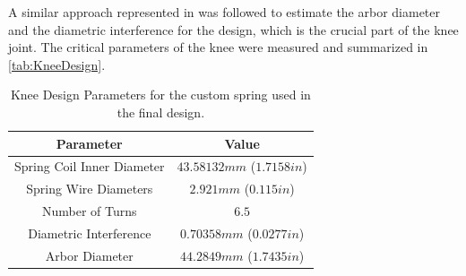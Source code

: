 A similar approach represented in \cite{tung2013design} was followed to estimate the arbor diameter and the diametric interference for the design, which is the crucial part of the knee joint. The critical parameters of the knee were measured and summarized in \autoref{tab:KneeDesign}.

\begin{table}[h!]
\centering
 \begin{tabular}{|c || c|} 
 \hline
 Parameter & Value  \\ [0.5ex] 
 \hline\hline
 Spring Coil Inner Diameter   & $43.58132mm$ ($1.7158in$)   \\
\hline
Spring Wire Diameters &   $2.921mm$  ($0.115in$)  \\
\hline
Number of Turns     &   $6.5$ \\
\hline
Diametric Interference    &   $0.70358mm$ ($0.0277in$) \\
 \hline
  Arbor Diameter &  $44.2849mm$ ($1.7435 in$) \\ [1ex]
 \hline
 \end{tabular}
\caption[Knee Parameters]{Knee Design Parameters for the custom spring used in the final design.}
\label{tab:KneeDesign}
\end{table}






